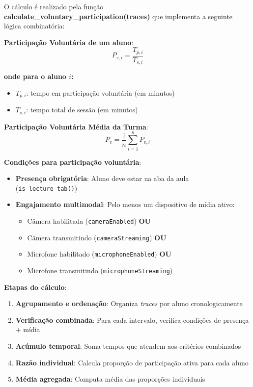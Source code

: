 O cálculo é realizado pela função \textbf{calculate\_voluntary\_participation(traces)} que implementa a seguinte lógica combinatória:

\textbf{Participação Voluntária de um aluno}:
\begin{equation}
P_{v,i} = \frac{T_{p,i}}{T_{s,i}}
\end{equation}

\textbf{onde para o aluno $i$:}
\begin{itemize}
    \item $T_{p,i}$: tempo em participação voluntária (em minutos)
    \item $T_{s,i}$: tempo total de sessão (em minutos)
\end{itemize}

\textbf{Participação Voluntária Média da Turma}:
\begin{equation}
\bar{P}_v = \frac{1}{n} \sum_{i=1}^{n} P_{v,i}
\end{equation}

% 

\textbf{Condições para participação voluntária}:
\begin{itemize}
    \item \textbf{Presença obrigatória}: Aluno deve estar na aba da aula (\texttt{is\_lecture\_tab()})
    \item \textbf{Engajamento multimodal}: Pelo menos um dispositivo de mídia ativo:
          \begin{itemize}
              \item Câmera habilitada (\texttt{cameraEnabled}) \textbf{OU}
              \item Câmera transmitindo (\texttt{cameraStreaming}) \textbf{OU}
              \item Microfone habilitado (\texttt{microphoneEnabled}) \textbf{OU}
              \item Microfone transmitindo (\texttt{microphoneStreaming})
          \end{itemize}
\end{itemize}

\textbf{Etapas do cálculo}:
\begin{enumerate}
    \item \textbf{Agrupamento e ordenação}: Organiza \textit{traces} por aluno cronologicamente
    \item \textbf{Verificação combinada}: Para cada intervalo, verifica condições de presença + mídia
    \item \textbf{Acúmulo temporal}: Soma tempos que atendem aos critérios combinados
    \item \textbf{Razão individual}: Calcula proporção de participação ativa para cada aluno
    \item \textbf{Média agregada}: Computa média das proporções individuais
\end{enumerate}
